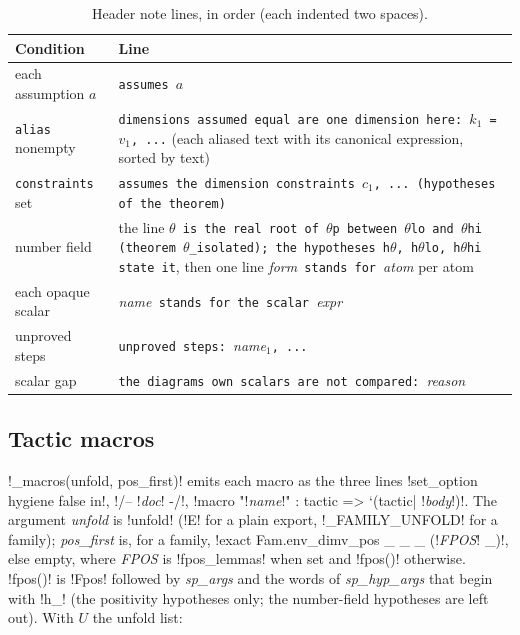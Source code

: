 {\begin{xltabular}{\linewidth}{@{}p{4.3cm}X@{}}
\caption{Header note lines, in order (each indented two spaces).}\label{tab:lean-export-net-notes}\\
\toprule
Condition & Line \\
\midrule
each assumption $a$ & \texttt{assumes }$a$ \\
\texttt{alias} nonempty & \texttt{dimensions assumed equal are one dimension here: }$k_1$\texttt{ = }$v_1$\texttt{, ...}
  (each aliased text with its canonical expression, sorted by text) \\
\texttt{constraints} set & \texttt{assumes the dimension constraints }$c_1$\texttt{, ... (hypotheses of the theorem)} \\
number field & the line
  \texttt{$\theta$ is the real root of $\theta$p between $\theta$lo and $\theta$hi (theorem $\theta$\_\allowbreak{}isolated); the hypotheses h$\theta$, h$\theta$lo, h$\theta$hi state it},
  then one line \textit{form}\texttt{ stands for }\textit{atom} per atom \\
each opaque scalar & \textit{name}\texttt{ stands for the scalar }\textit{expr} \\
unproved steps & \texttt{unproved steps: }\textit{name}$_1$\texttt{, ...} \\
scalar gap & \texttt{the diagrams\textquotesingle{} own scalars are not compared: }\textit{reason} \\
\bottomrule
\end{xltabular}

\subsection{Tactic macros}\label{sec:lean-export-net-macros}

\py!_macros(unfold, pos_first)! emits each macro as the three lines
\code!set_option hygiene false in!, \code!/-- !\textit{doc}\code! -/!,
\code!macro "!\textit{name}\code!" : tactic => `(tactic| !\textit{body}\code!)!. The argument
\textit{unfold} is \py!unfold! (\code!E! for a plain export, \py!_FAMILY_UNFOLD! for a family);
\textit{pos\_first} is, for a family,
\code!exact Fam.env_dimv_pos _ _ _ (!\textit{FPOS}\code! _)!, else empty, where \textit{FPOS} is
\py!fpos_lemmas! when set and \py!fpos()! otherwise. \py!fpos()! is \code!Fpos! followed by
\textit{sp\_args} and the words of \textit{sp\_hyp\_args} that begin with \code!h_! (the
positivity hypotheses only; the number-field hypotheses are left out).
With $U$ the unfold list:

}
